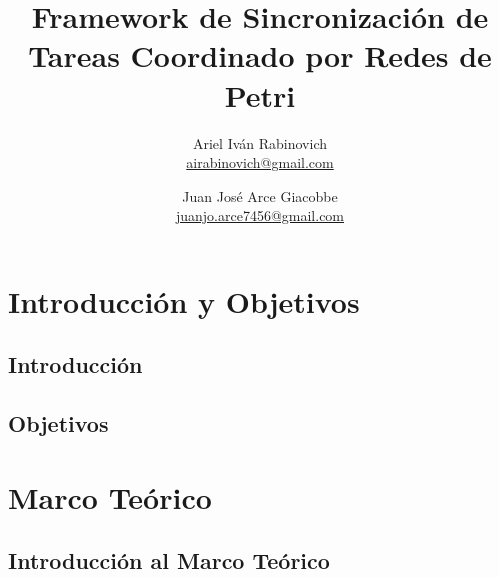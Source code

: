 \documentclass{report}
\date{}
\newcounter{definitionsCounter}
\begin{document}
    \newcommand{\nombreTesis}{Framework de Sincronización de Tareas Coordinado
    por Redes de Petri}
    \newcommand{\nombreFramework}{Baboon}
    \newcommand{\javapetriconcurrencymonitor}{Java Petri Concurrency Monitor }
    
    \newcommand{\repoMonitor}{https://github.com/airabinovich/java_petri_engine.git}
    \newcommand{\repoFramework}{https://github.com/juanjoarce7456/petri_event_dispatcher.git}

    \title{\nombreTesis}
    \author{Ariel Iván Rabinovich \\ \href{mailto:airabinovich@gmail.com}{airabinovich@gmail.com}
        \and Juan José Arce Giacobbe \\ \href{mailto:juanjo.arce7546@gmail.com}{juanjo.arce7456@gmail.com}}
    \graphicspath{ {resources/images/} }
    
    \maketitle
    
    \tableofcontents
    
    \listoffigures
    \listoftables
    
    \setcounter{definitionsCounter}{0}
    \part{Introducción y Objetivos}
        \chapter{Introducción}
        
        \chapter{Objetivos}
        
    \part{Marco Teórico}
        \label{cap:marco_teorico}
        \chapter{Introducción al Marco Teórico}
        
\end{document}
